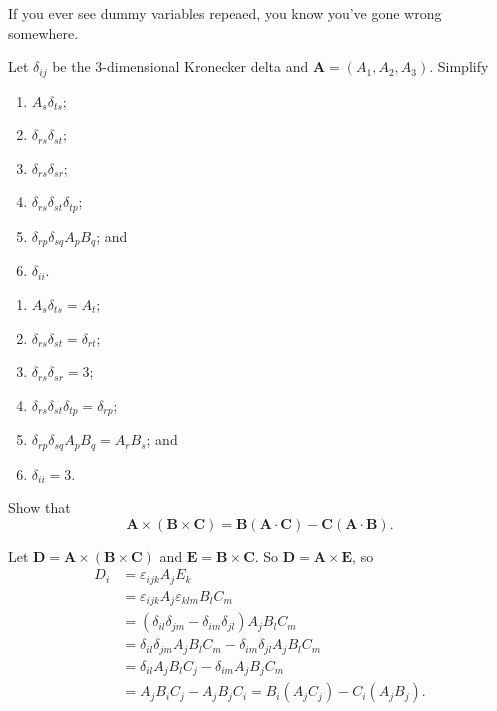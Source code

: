 
\begin{remark}
    If you ever see dummy variables repeaed, you know you've gone wrong somewhere.
\end{remark}

\begin{example}
    Let $\delta_{ij}$ be the 3-dimensional Kronecker delta and $\bm A = (A_1, A_2, A_3)$. Simplify
    \begin{enumerate}
        \item $A_s\delta_{ts}$;
        \item $\delta_{rs}\delta_{st}$;
        \item $\delta_{rs}\delta_{sr}$;
        \item $\delta_{rs}\delta_{st}\delta_{tp}$;
        \item $\delta_{rp}\delta_{sq}A_pB_q$; and
        \item $\delta_{ii}$.
    \end{enumerate}
\end{example}

\begin{solution}
    \begin{enumerate}
        \item $A_s\delta_{ts} = A_t$;
        \item $\delta_{rs}\delta_{st} = \delta_{rt}$;
        \item $\delta_{rs}\delta_{sr} = 3$;
        \item $\delta_{rs}\delta_{st}\delta_{tp} = \delta_{rp}$;
        \item $\delta_{rp}\delta_{sq}A_pB_q = A_rB_s$; and
        \item $\delta_{ii} = 3$.
    \end{enumerate}
\end{solution}

\begin{example}
    Show that 
    \[ \bm A \times (\bm B \times \bm C) = \bm B(\bm A \cdot \bm C) - \bm C(\bm A \cdot \bm B). \]
\end{example}

\begin{solution}
    Let $\bm D = \bm A \times (\bm B \times \bm C)$ and $\bm E = \bm B \times \bm C$. So $\bm D = \bm A \times \bm E$, so 
    \begin{align*}
        D_i &= \varepsilon_{ijk}A_jE_k \\
            &= \varepsilon_{ijk}A_j\varepsilon_{klm}B_lC_m \\
            &= (\delta_{il}\delta_{jm} - \delta_{im}\delta_{jl})A_jB_lC_m \\
            &= \delta_{il}\delta_{jm}A_jB_lC_m - \delta_{im}\delta_{jl}A_jB_lC_m \\
            &= \delta_{il}A_jB_lC_j - \delta_{im}A_jB_jC_m \\
            &= A_jB_iC_j - A_jB_jC_i  = B_i(A_jC_j) - C_i(A_jB_j).
    \end{align*}
\end{solution}
